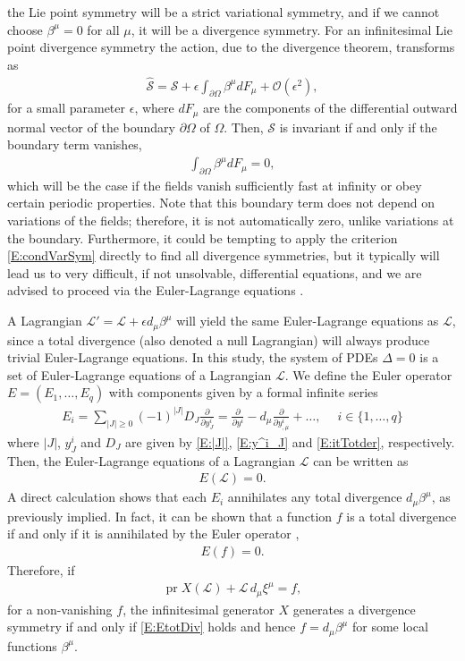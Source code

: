 \documentclass[a4paper,hidelinks, 12pt]{article}
\numberwithin{equation}{section}
\theoremstyle{plain}
\newcommand{\mc}{\mathcal}
\newcommand{\on}{\operatorname}
\begin{document}
the Lie point symmetry will be a {strict variational symmetry}, and if we cannot choose $\beta^\mu=0$ 
for all $\mu$,
it will be a {divergence symmetry}. 
For an infinitesimal Lie point divergence symmetry the action, due to the divergence theorem, transforms as
\begin{align}
	\hat{\mc{S}}=\mc{S}+\epsilon \int_{\partial \Omega}\beta^\mu dF_\mu + \mc{O}(\epsilon^2),  
\end{align}
for a small parameter $\epsilon$, where $dF_\mu$ are the components of the differential outward normal vector of the boundary $\partial \Omega$ of $\Omega$. Then, $\mc{S}$ is invariant if and only if the boundary term vanishes,
\begin{align}\label{E:boundTerm}
	\int_{\partial \Omega}\beta^\mu dF_\mu=0,
\end{align}
which will be the case if the fields vanish sufficiently fast at infinity or obey certain periodic properties. Note that this boundary term does not depend on variations of the fields; therefore, it is not automatically zero, unlike variations at the boundary. Furthermore, it could be tempting to apply the criterion \eqref{E:condVarSym} directly to find all divergence symmetries, but it typically will lead us to very difficult, if not unsolvable, differential equations, and we are advised to proceed via the Euler-Lagrange equations \cite{sym10120744}.


A Lagrangian $\mc{L}'=\mc{L}+\epsilon d_\mu\beta^\mu$
will yield the same Euler-Lagrange equations as $\mc{L}$, since a total divergence (also denoted a null Lagrangian) will always produce trivial Euler-Lagrange equations. %
In this study, the system of PDEs $\Delta=0$ is a set of Euler-Lagrange equations of a Lagrangian $\mc{L}$. We define the Euler operator $E=(E_1,\ldots,E_q)$ with components given by a formal infinite series
\begin{align}\label{E:EulerOpComps}
	E_i=\sum_{|J|\geq 0} (-1)^{|J|} D_J \frac{\partial}{\partial y^i_J}
	=\frac{\partial}{\partial y^i}-d_\mu \frac{\partial}{\partial y^i_{,\mu}}+\ldots,
	\quad \; i \in \{1,\ldots,q\}
\end{align}
where $|J|$, $y^i_J$ and $D_J$ are given by \eqref{E:|J|}, \eqref{E:y^i_J} and \eqref{E:itTotder}, respectively.  
Then, the Euler-Lagrange equations of a Lagrangian $\mc{L}$ can be written as
\begin{align}\label{E:ELeqs}
	E(\mc{L})=0.
\end{align}
A direct calculation shows that each $E_i$ annihilates any total divergence $d_\mu\beta^\mu$, as previously implied.
 In fact, it can be shown that a function $f$ is a total divergence if and only if it is annihilated by the Euler operator \cite{olver1998applications},
\begin{align}\label{E:EtotDiv}
	E(f)=0.
\end{align}
Therefore, if 
\begin{align}\label{E:divSymmetry}
	\on{pr}X(\mc{L})+\mc{L}\,d_\mu \xi^\mu=f,
\end{align}
for a non-vanishing $f$, the infinitesimal generator $X$ generates a divergence symmetry if and only if \eqref{E:EtotDiv}
	holds and hence $f=d_\mu \beta^\mu$ for some local functions $\beta^\mu$.
	
\end{document}
